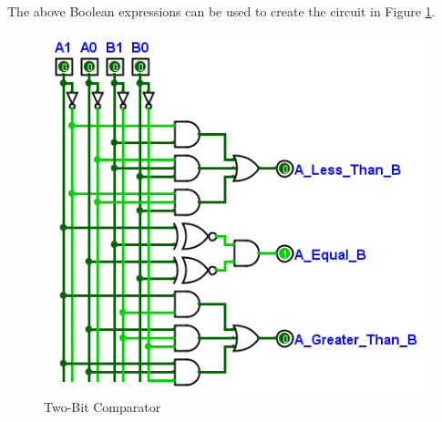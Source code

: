 The above Boolean expressions can be used to create the circuit in Figure \ref{fig:08_13}.

\begin{figure}[H]
	\centering
	\includegraphics[width=\maxwidth{.95\linewidth}]{gfx/08_13}
	\caption{Two-Bit Comparator}
	\label{fig:08_13}
\end{figure}


